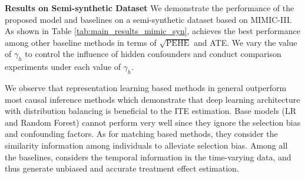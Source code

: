 \noindent\textbf{Results on Semi-synthetic Dataset}
We demonstrate the performance of the proposed model and baselines on a semi-synthetic dataset based on MIMIC-III. As shown in Table \ref{tab:main_results_mimic_syn}, \model achieves the best performance among other baseline methods in terms of $\sqrt{\text{PEHE}}$ and ATE. We vary the value of $\gamma_h$ to control the influence of hidden confounders and conduct comparison experiments under each value of $\gamma_h$. 

We observe that representation learning based methods in general outperform most causal inference methods which demonstrate that deep learning architecture with distribution balancing is beneficial to the ITE estimation. Base models (LR and Random Forest) cannot perform very well since they ignore the selection bias and confounding factors. As for matching based methods, they consider the similarity information among individuals to alleviate selection bias. Among all the baselines, \model considers the temporal information in the time-varying data, and thus generate unbiased and accurate treatment effect estimation.




